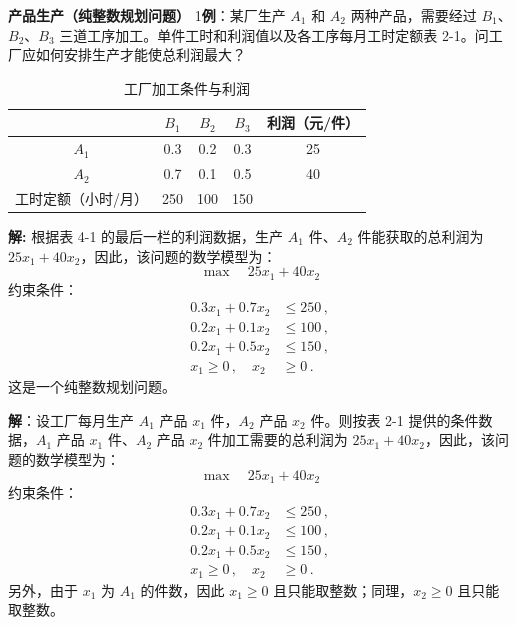 \begin{exbox}{\textbf{产品生产（纯整数规划问题）}}
    1\textbf{例}：某厂生产 $A_1$ 和 $A_2$ 两种产品，需要经过 $B_1$、$B_2$、$B_3$ 三道工序加工。单件工时和利润值以及各工序每月工时定额表 2-1。问工厂应如何安排生产才能使总利润最大？
    
    \begin{table}[H]
        \centering
        \label{tab:2-1}
        \renewcommand{\arraystretch}{1.5}
        \begin{tabular}{|c|c|c|c|c|}
            \hline
            & $B_1$ & $B_2$ & $B_3$ & 利润（元/件） \\ \hline
            $A_1$ & 0.3 & 0.2 & 0.3 & 25 \\ \hline
            $A_2$ & 0.7 & 0.1 & 0.5 & 40 \\ \hline
            工时定额（小时/月） & 250 & 100 & 150 & \\ \hline
        \end{tabular}
        \caption{工厂加工条件与利润}
    \end{table}
    
    \textbf{解:} 根据表 4-1 的最后一栏的利润数据，生产 $A_1$ 件、$A_2$ 件能获取的总利润为 $25x_1 + 40x_2$，因此，该问题的数学模型为：
    \begin{equation}
        \max \quad 25x_1 + 40x_2 \label{eq:obj}
    \end{equation}
    约束条件：
    \begin{align}
        0.3x_1 + 0.7x_2 &\leq 250 \,, \label{eq:c1} \\
        0.2x_1 + 0.1x_2 &\leq 100 \,, \label{eq:c2} \\
        0.2x_1 + 0.5x_2 &\leq 150 \,, \label{eq:c3} \\
        x_1 \geq 0 \,, \quad x_2 &\geq 0 \,. \label{eq:nonneg}
    \end{align}
    这是一个纯整数规划问题。
    
    \textbf{解}：设工厂每月生产 $A_1$ 产品 $x_1$ 件，$A_2$ 产品 $x_2$ 件。则按表 2-1 提供的条件数据，$A_1$ 产品 $x_1$ 件、$A_2$ 产品 $x_2$ 件加工需要的总利润为 $25x_1 + 40x_2$，因此，该问题的数学模型为：
    \begin{equation}
        \max \quad 25x_1 + 40x_2
    \end{equation}
    约束条件：
    \begin{align}
        0.3x_1 + 0.7x_2 &\leq 250 \,, \tag{$B_1$ 工序，工时限制} \\
        0.2x_1 + 0.1x_2 &\leq 100 \,, \tag{$B_2$ 工序，工时限制} \\
        0.2x_1 + 0.5x_2 &\leq 150 \,, \tag{$B_3$ 工序，工时限制} \\
        x_1 \geq 0 \,, \quad x_2 &\geq 0 \,. \tag{且只能整数}
    \end{align}
    另外，由于 $x_1$ 为 $A_1$ 的件数，因此 $x_1 \geq 0$ 且只能取整数；同理，$x_2 \geq 0$ 且只能取整数。
\end{exbox}


